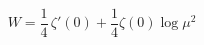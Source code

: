 \begin{equation}
\label{effact}
W=\frac{1}{4}\,\zeta'(0)+\frac{1}{4} \zeta(0) \log \mu^2
\end{equation}

